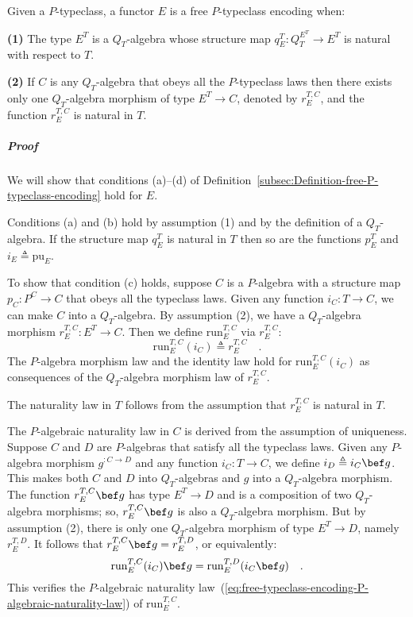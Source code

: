 Given a $P$-typeclass, a functor $E$ is a free $P$-typeclass encoding
when:

\textbf{(1)} The type $E^{T}$ is a $Q_{T}$-algebra whose structure
map $q_{E}^{T}:Q_{T}^{E^{T}}\rightarrow E^{T}$ is natural with respect
to $T$.

\textbf{(2)} If $C$ is any $Q_{T}$-algebra that obeys all the $P$-typeclass
laws then there exists only one $Q_{T}$-algebra morphism of type
$E^{T}\rightarrow C$, denoted by $r_{E}^{T,C}$, and the function
$r_{E}^{T,C}$ is natural in $T$. 

\subparagraph{Proof}

We will show that conditions (a)–(d) of Definition~\ref{subsec:Definition-free-P-typeclass-encoding}
hold for $E$.

Conditions (a) and (b) hold by assumption (1) and by the definition
of a $Q_{T}$-algebra. If the structure map $q_{E}^{T}$ is natural
in $T$ then so are the functions $p_{E}^{T}$ and $i_{E}\triangleq\text{pu}_{E}$.

To show that condition (c) holds, suppose $C$ is a $P$-algebra with
a structure map $p_{C}:P^{C}\rightarrow C$ that obeys all the typeclass
laws. Given any function $i_{C}:T\rightarrow C$, we can make $C$
into a $Q_{T}$-algebra. By assumption (2), we have a $Q_{T}$-algebra
morphism $r_{E}^{T,C}:E^{T}\rightarrow C$. Then we define $\text{run}_{E}^{T,C}$
via $r_{E}^{T,C}$:
\[
\text{run}_{E}^{T,C}(i_{C})\triangleq r_{E}^{T,C}\quad.
\]
The $P$-algebra morphism law and the identity law hold for $\text{run}_{E}^{T,C}(i_{C})$
as consequences of the $Q_{T}$-algebra morphism law of $r_{E}^{T,C}$.

The naturality law in $T$ follows from the assumption that $r_{E}^{T,C}$
is natural in $T$. 

The $P$-algebraic naturality law in $C$ is derived from the assumption
of uniqueness. Suppose $C$ and $D$ are $P$-algebras that satisfy
all the typeclass laws. Given any $P$-algebra morphism $g^{:C\rightarrow D}$
and any function $i_{C}:T\rightarrow C$, we define $i_{D}\triangleq i_{C}\bef g$.
This makes both $C$ and $D$ into $Q_{T}$-algebras and $g$ into
a $Q_{T}$-algebra morphism. The function $r_{E}^{T,C}\bef g$ has
type $E^{T}\rightarrow D$ and is a composition of two $Q_{T}$-algebra
morphisms; so, $r_{E}^{T,C}\bef g$ is also a $Q_{T}$-algebra morphism.
But by assumption (2), there is only one $Q_{T}$-algebra morphism
of type $E^{T}\rightarrow D$, namely $r_{E}^{T,D}$. It follows that
$r_{E}^{T,C}\bef g=r_{E}^{T,D}$, or equivalently:
\[
\text{run}_{E}^{T,C}(i_{C})\bef g=\text{run}_{E}^{T,D}(i_{C}\bef g)\quad.
\]
 This verifies the $P$-algebraic naturality law~(\ref{eq:free-typeclass-encoding-P-algebraic-naturality-law})
of $\text{run}_{E}^{T,C}$.

